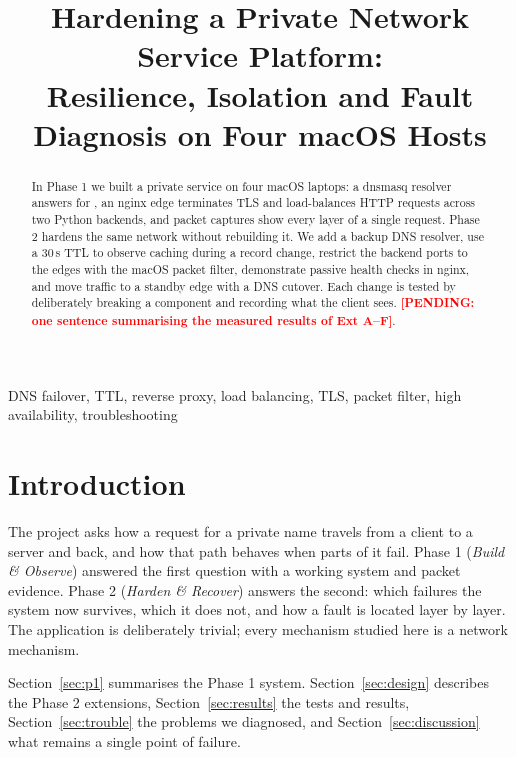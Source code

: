 \documentclass[conference]{IEEEtran}
\newcommand{\pending}[1]{\textcolor{red}{\textbf{[PENDING: #1]}}}
\newcommand{\code}[1]{\texttt{\detokenize{#1}}}
\begin{document}
\title{Hardening a Private Network Service Platform:\\
Resilience, Isolation and Fault Diagnosis on Four macOS Hosts}

\author{
}

\maketitle

\begin{abstract}
In Phase 1 we built a private service on four macOS laptops: a dnsmasq
resolver answers for \code{app.team1.test}, an nginx edge terminates TLS
and load-balances HTTP requests across two Python backends, and packet
captures show every layer of a single request. Phase 2 hardens the same
network without rebuilding it. We add a backup DNS resolver, use a 30\,s
TTL to observe caching during a record change, restrict the backend ports
to the edges with the macOS packet filter, demonstrate passive health
checks in nginx, and move traffic to a standby edge with a DNS cutover.
Each change is tested by deliberately breaking a component and recording
what the client sees. \pending{one sentence summarising the measured
results of Ext A--F}.
\end{abstract}

\begin{IEEEkeywords}
DNS failover, TTL, reverse proxy, load balancing, TLS, packet filter,
high availability, troubleshooting
\end{IEEEkeywords}

\section{Introduction}
The project asks how a request for a private name travels from a client
to a server and back, and how that path behaves when parts of it fail.
Phase 1 (\emph{Build \& Observe}) answered the first question with a
working system and packet evidence. Phase 2 (\emph{Harden \& Recover})
answers the second: which failures the system now survives, which it
does not, and how a fault is located layer by layer. The application is
deliberately trivial; every mechanism studied here is a network
mechanism.

Section~\ref{sec:p1} summarises the Phase 1 system. Section~\ref{sec:design}
describes the Phase 2 extensions, Section~\ref{sec:results} the tests and
results, Section~\ref{sec:trouble} the problems we diagnosed, and
Section~\ref{sec:discussion} what remains a single point of failure.
\end{document}
